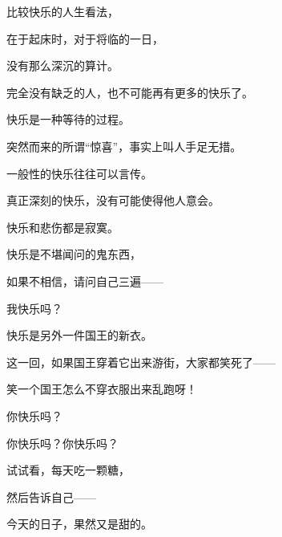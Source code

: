 \par 比较快乐的人生看法，
\par 在于起床时，对于将临的一日，
\par 没有那么深沉的算计。
\par 
\par 完全没有缺乏的人，也不可能再有更多的快乐了。
\par 
\par 快乐是一种等待的过程。
\par 突然而来的所谓“惊喜”，事实上叫人手足无措。
\par 
\par 一般性的快乐往往可以言传。
\par 真正深刻的快乐，没有可能使得他人意会。
\par 快乐和悲伤都是寂寞。
\par 
\par 快乐是不堪闻问的鬼东西，
\par 如果不相信，请问自己三遍——
\par 我快乐吗？
\par 
\par 快乐是另外一件国王的新衣。
\par 这一回，如果国王穿着它出来游街，大家都笑死了——
\par 笑一个国王怎么不穿衣服出来乱跑呀！
\par 
\par 你快乐吗？
\par 你快乐吗？你快乐吗？
\par 
\par 试试看，每天吃一颗糖，
\par 然后告诉自己——
\par 今天的日子，果然又是甜的。


\subsubsection{}




